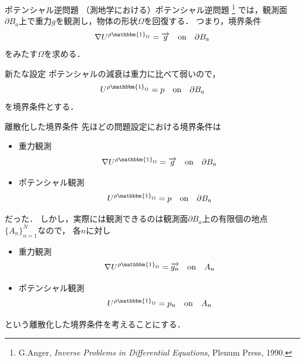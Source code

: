 \documentclass[dvipdfmx]{beamer}
\theoremstyle{remark}
\begin{document}
\begin{frame}{ポテンシャル逆問題}
  （測地学における）ポテンシャル逆問題
  \footnote{
    G.Anger, 
    \textit{Inverse Problems in Differential Equations},
    Plenum Press,
    1990.
  }
  では，観測面$\partial B_a$上で重力$g$を観測し，物体の形状$\Omega$を回復する．
  つまり，境界条件
    \[
      \nabla U^{\rho\mathbbm{1}_\Omega} = \overrightarrow{g} \quad \mathrm{on} \quad \partial B_a \nonumber
    \]
  をみたす$\Omega$を求める．
  \begin{itembox}[c]{新たな設定}
  ポテンシャルの減衰は重力に比べて弱いので，
  \[
    U^{\rho\mathbbm{1}_\Omega} = p \quad \mathrm{on} \quad \partial B_a
  \]
  を境界条件とする．
  \end{itembox}
\end{frame}

\begin{frame}{離散化した境界条件}
  先ほどの問題設定における境界条件は
  \begin{itemize}
    \item 重力観測
    \[
      \nabla U^{\rho\mathbbm{1}_\Omega} = \overrightarrow{g} \quad \mathrm{on} \quad \partial B_a
    \]
  
    \item ポテンシャル観測
    \[
      U^{\rho\mathbbm{1}_\Omega} = p \quad \mathrm{on} \quad \partial B_a
    \]
  \end{itemize}
  だった．
  しかし，実際には観測できるのは観測面$\partial B_a$上の有限個の地点$\{A_n\}_{n=1}^N$なので，
  各$n$に対し
  \begin{itemize}
    \item 重力観測
    \[
      \nabla U^{\rho\mathbbm{1}_\Omega} = \overrightarrow{g_n} \quad \mathrm{on} \quad A_n
    \]
  
    \item ポテンシャル観測
    \[
      U^{\rho\mathbbm{1}_\Omega} = p_n \quad \mathrm{on} \quad A_n
    \]
  \end{itemize}
  という離散化した境界条件を考えることにする．
\end{frame}
\end{document}
